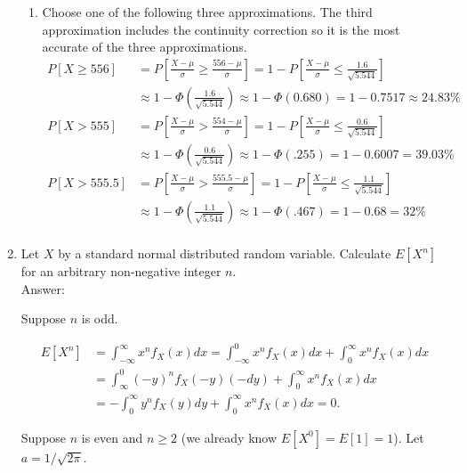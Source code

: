 \documentclass{article}
\begin{document}
\begin{enumerate}
\begin{enumerate}
\item
Choose one of the following three approximations. The third approximation includes the continuity correction so it is the most accurate of the three approximations. 
\begin{align*}
P[X \geq 556] &= P\left[\frac{X - \mu}{\sigma} \geq \frac{556 - \mu}{\sigma}\right]
= 1-P\left[\frac{X - \mu}{\sigma} \leq \frac{1.6}{\sqrt{5.544}}\right] \\
&\approx 1 - \Phi\left(\frac{1.6}{\sqrt{5.544}}\right) \approx 1 - \Phi(0.680) = 1- 0.7517 \approx 24.83 \% \\
P[X > 555] &= P\left[\frac{X - \mu}{\sigma} > \frac{554 - \mu}{\sigma}\right]
= 1-P\left[\frac{X - \mu}{\sigma} \leq \frac{0.6}{\sqrt{5.544}}\right] \\
&\approx 1 - \Phi\left(\frac{0.6}{\sqrt{5.544}}\right) \approx 1 - \Phi(.255) = 1- 0.6007  = 39.03 \% \\
P[X > 555.5] &= P\left[\frac{X - \mu}{\sigma} > \frac{555.5 - \mu}{\sigma}\right]
= 1-P\left[\frac{X - \mu}{\sigma} \leq \frac{1.1}{\sqrt{5.544}}\right] \\
&\approx 1 - \Phi\left(\frac{1.1}{\sqrt{5.544}}\right) \approx 1 - \Phi(.467) = 1- 0.68 = 32\% \\
\end{align*}
\end{enumerate}

\newpage
\item

Let $X$ by a standard normal distributed random variable. Calculate $E[X^n]$ for an
arbitrary non-negative integer $n$.\\

Answer:

Suppose $n$ is odd.

\begin{align*}
E[X^n] &= \int_{-\infty}^\infty x^n f_X(x) dx 
= \int_{-\infty}^0 x^n f_X(x) dx + \int_0^\infty x^n f_X(x) dx \\
&= \int_{\infty}^0 (-y)^n f_X(-y) (-dy) + \int_{0}^\infty x^n f_X(x) dx  \\
&= -\int_{0}^\infty y^nf_X(y) dy + \int_0^\infty x^n f_X(x) dx = 0.
\end{align*}

Suppose $n$ is even and $n\geq 2$ (we already know $E[X^0] = E[1] = 1$). Let $a = 1/\sqrt{2\pi}$. 


\end{enumerate}
\end{document}
